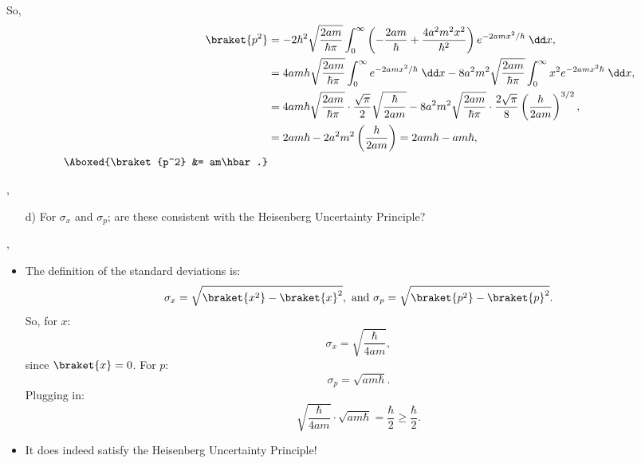 \begin{example}
\begin{itemize}
\begin{equation*}
            \end{equation*}
            So,
            \begin{align*}
                \braket{p^2} &= -2\hbar^2 \sqrt{\frac{2am}{\hbar\pi}} \int_0^{\infty} \left(-\frac{2am}{\hbar} + \frac{4a^2m^2x^2}{\hbar^2}\right)e^{-2amx^2/\hbar} \;\dd x, \\
                &= 4amh\sqrt{\frac{2am}{\hbar\pi}} \int_0^{\infty} e^{-2amx^2/\hbar} \;\dd x -8a^2m^2\sqrt{\frac{2am}{\hbar\pi}} \int_0^{\infty} x^2 e^{-2amx^2\hbar} \;\dd x, \\
                &= 4am\hbar \sqrt{\frac{2am}{\hbar\pi}} \cdot \frac{\sqrt{\pi}}{2}\sqrt{\frac{\hbar}{2am}} - 8a^2m^2\sqrt{\frac{2am}{\hbar\pi}} \cdot \frac{2\sqrt{\pi}}{8} \left(\frac{h}{2am}\right)^{3/2}, \\
                &=2am\hbar - 2a^2m^2 \left(\frac{h}{2am}\right) = 2am\hbar - am\hbar, \\
                \Aboxed{\braket{p^2} &= am\hbar.}
            \end{align*}
    \end{itemize}

    \sep

    \begin{itemize}
        \item[d)] For $\sigma_x$ and $\sigma_p$; are these consistent with the Heisenberg Uncertainty Principle?
    \end{itemize}

    \sep

    \begin{itemize}
        \item The definition of the standard deviations is:
            \begin{equation}
                \sigma_x = \sqrt{\braket{x^2} - \braket{x}^2},\ \text{and}\ \sigma_p = \sqrt{\braket{p^2} - \braket{p}^2}.
            \end{equation}
            So, for $x$:
            \begin{equation*}
                \sigma_x = \sqrt{\frac{\hbar}{4am}},
            \end{equation*}
            since $\braket{x} = 0$. For $p$:    
            \begin{equation*}
                \sigma_p = \sqrt{am\hbar}.
            \end{equation*}
            Plugging in:
            \begin{equation*}
                \sqrt{\frac{\hbar}{4am}}\cdot\sqrt{am\hbar} = \frac{\hbar}{2} \geq \frac{\hbar}{2}.
            \end{equation*}
        \item It does indeed satisfy the Heisenberg Uncertainty Principle!
    \end{itemize}
\end{example}


